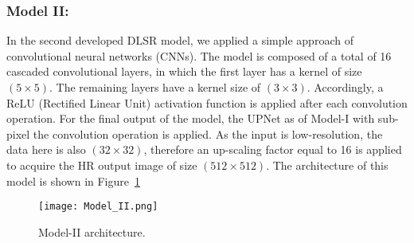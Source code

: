 \subsubsection{Model II:}
In the second developed DLSR model, we applied a simple approach of convolutional neural networks (CNNs). 
The model is composed of a total of 16 cascaded convolutional layers, in which the first layer has a kernel of size \((5\times 5)\).
The remaining layers have a kernel size of \((3\times 3)\). 
Accordingly, a ReLU (Rectified Linear Unit) activation function is applied 
after each convolution operation.
For the final output of the model, the UPNet as of Model-I with sub-pixel 
the convolution operation is applied. 
As the input is low-resolution, the data here is also \((32\times 32)\), therefore an up-scaling factor equal to 16 is applied to acquire the HR output image of size \((512\times 512)\). 
The architecture of this model is shown in Figure~\ref{fig:Model_II}
\begin{figure} [ht!]
	\begin{center}
		\texttt{[image: Model\_II.png]}
	\end{center}
	\caption{Model-II architecture.} 
	\label{fig:Model_II}
\end{figure}
